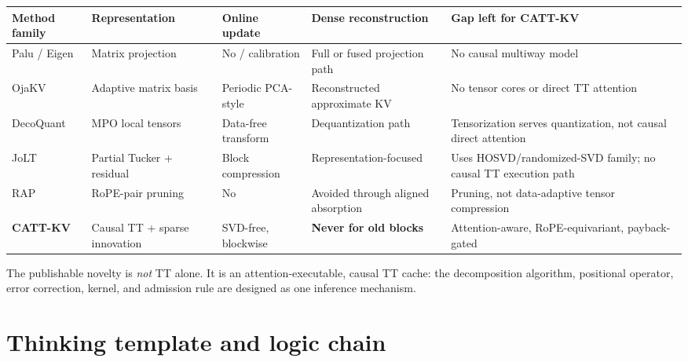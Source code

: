 \documentclass[11pt]{article}
\begin{document}
\begin{center}
\scriptsize
\renewcommand{\arraystretch}{1.23}
\begin{tabularx}{\textwidth}{@{}p{2.1cm}p{2.4cm}p{2.25cm}p{2.25cm}X@{}}
\toprule
\textbf{Method family} & \textbf{Representation} & \textbf{Online update} & \textbf{Dense reconstruction} & \textbf{Gap left for CATT-KV} \\
\midrule
Palu / Eigen & Matrix projection & No / calibration & Full or fused projection path & No causal multiway model \\
OjaKV & Adaptive matrix basis & Periodic PCA-style & Reconstructed approximate KV & No tensor cores or direct TT attention \\
DecoQuant & MPO local tensors & Data-free transform & Dequantization path & Tensorization serves quantization, not causal direct attention \\
JoLT & Partial Tucker + residual & Block compression & Representation-focused & Uses HOSVD/randomized-SVD family; no causal TT execution path \\
RAP & RoPE-pair pruning & No & Avoided through aligned absorption & Pruning, not data-adaptive tensor compression \\
\textbf{CATT-KV} & Causal TT + sparse innovation & SVD-free, blockwise & \textbf{Never for old blocks} & Attention-aware, RoPE-equivariant, payback-gated \\
\bottomrule
\end{tabularx}
\end{center}

\begin{claimbox}
The publishable novelty is \emph{not} TT alone. It is an attention-executable, causal TT cache:
the decomposition algorithm, positional operator, error correction, kernel, and admission rule
are designed as one inference mechanism.
\end{claimbox}

\section{Thinking template and logic chain}
\end{document}
